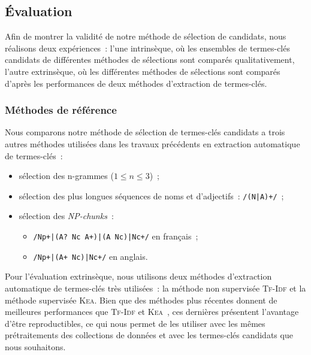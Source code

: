     \subsection{Évaluation}
    \label{subsec:main:domain_independent_keyphrase_extraction-keyphrase_candidate_selection-evaluation}
      Afin de montrer la validité de notre méthode de sélection de candidats,
      nous réalisons deux expériences~: l'une intrinsèque, où les ensembles de
      termes-clés candidats de différentes méthodes de sélections sont comparés
      qualitativement, l'autre extrinsèque, où les différentes méthodes de
      sélections sont comparés d'après les performances de deux méthodes
      d'extraction de termes-clés.

      \subsubsection{Méthodes de référence}
      \label{subsubsec:main:domain_independent_keyphrase_extraction-keyphrase_candidate_selection-evaluation-baselines}
        Nous comparons notre méthode de sélection de termes-clés candidats a
        trois autres méthodes utilisées dans les travaux précédents en
        extraction automatique de termes-clés~:
        \begin{itemize}
          \item{sélection des n-grammes ($1 \leq n \leq 3$)~;}
          \item{sélection des plus longues séquences de noms et d'adjectifs~:
                \texttt{/(N|A)+/}~;}
          \item{sélection des \textit{NP-chunks}~:}
          \begin{itemize}
            \item{\texttt{/Np+|(A? Nc A+)|(A Nc)|Nc+/} en français~;}
            \item{\texttt{/Np+|(A+ Nc)|Nc+/} en anglais.}
          \end{itemize}
        \end{itemize}

        Pour l'évaluation extrinsèque, nous utilisons deux méthodes d'extraction
        automatique de termes-clés très utilisées~: la méthode non supervisée
        \textsc{Tf-Idf} et la méthode supervisée \textsc{Kea}. Bien que des
        méthodes plus récentes donnent de meilleures performances que
        \textsc{Tf-Idf} et \textsc{Kea}~\cite{kim2010semeval}, ces dernières
        présentent l'avantage d'être reproductibles, ce qui nous permet de les
        utiliser avec les mêmes prétraitements des collections de données et
        avec les termes-clés candidats que nous souhaitons.

